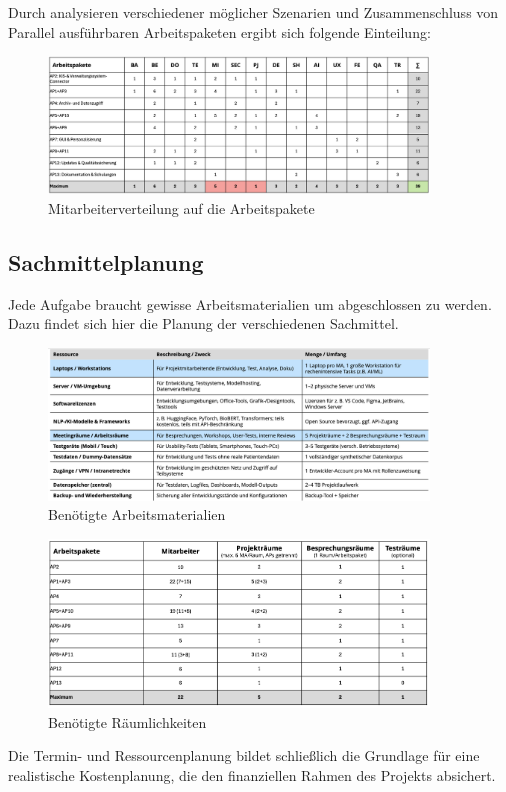 Durch analysieren verschiedener möglicher Szenarien und Zusammenschluss von Parallel ausführbaren Arbeitspaketen ergibt sich folgende Einteilung:
\begin{figure}[ht]
	\centering
	\includegraphics[width=0.9\textwidth]{fig/arbeiter.png}
	\caption{Mitarbeiterverteilung auf die Arbeitspakete}
	\label{fig:arbeiter}
\end{figure}
\subsection{Sachmittelplanung}
Jede Aufgabe braucht gewisse Arbeitsmaterialien um abgeschlossen zu werden. Dazu findet sich hier die Planung der verschiedenen Sachmittel.

\begin{figure}[ht]
	\centering
	\includegraphics[width=0.9\textwidth]{fig/material.png}
	\caption{Benötigte Arbeitsmaterialien}
	\label{fig:material}
\end{figure}\begin{figure}
	\centering
	\includegraphics[width=0.9\textwidth]{fig/räume.png}
	\caption{Benötigte Räumlichkeiten}
	\label{fig:räume}
\end{figure}

\pagebreak
Die Termin- und Ressourcenplanung bildet schließlich die Grundlage für eine realistische Kostenplanung, die den finanziellen Rahmen des Projekts absichert.